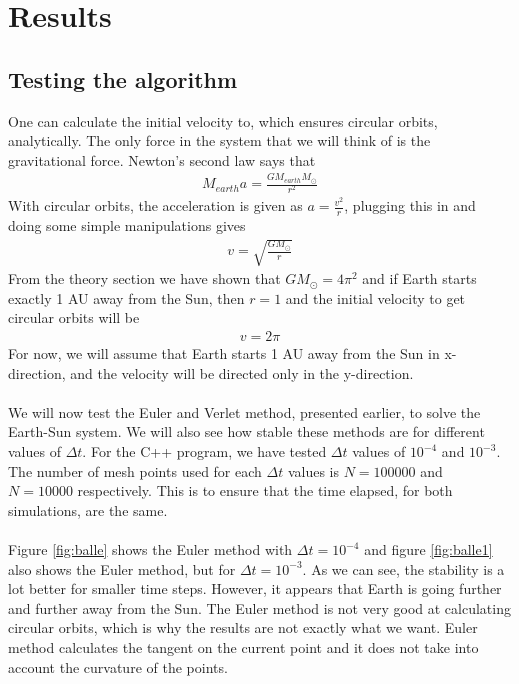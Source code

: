 \documentclass{article}
\begin{document}
\section{Results} \label{section:res}

\subsection{Testing the algorithm}
One can calculate the initial velocity to, which ensures circular orbits, analytically. The only force in the system that we will think of is the gravitational force. Newton's second law says that
\begin{align*}
M_{earth}a = \frac{GM_{earth}M_{\odot}}{r^2}
\end{align*}
With circular orbits, the acceleration is given as $a = \frac{v^2}{r}$, plugging this in and doing some simple manipulations gives
\begin{align*}
v = \sqrt{\frac{GM_{\odot}}{r}}
\end{align*}
From the theory section we have shown that $GM_{\odot} = 4\pi^2$ and if Earth starts exactly 1 AU away from the Sun, then $r = 1$ and the initial velocity to get circular orbits will be
\begin{align*}
v = 2\pi
\end{align*}
For now, we will assume that Earth starts 1 AU away from the Sun in x-direction, and the velocity will be directed only in the y-direction. \\\\
We will now test the Euler and Verlet method, presented earlier, to solve the Earth-Sun system. We will also see how stable these methods are for different values of $\Delta t$. For the C++ program, we have tested $\Delta t$ values of $10^{-4}$ and $10^{-3}$. The number of mesh points used for each $\Delta t$ values is $N = 100 000$ and $N=10 000$ respectively. This is to ensure that the time elapsed, for both simulations, are the same. \\\\
Figure \ref{fig:balle} shows the Euler method with $\Delta t = 10^{-4}$ and figure \ref{fig:balle1} also shows the Euler method, but for $\Delta t = 10^{-3}$. As we can see, the stability is a lot better for smaller time steps. However, it appears that Earth is going further and further away from the Sun. The Euler method is not very good at calculating circular orbits, which is why the results are not exactly what we want. Euler method calculates the tangent on the current point and it does not take into account the curvature of the points. \\
\end{document}
